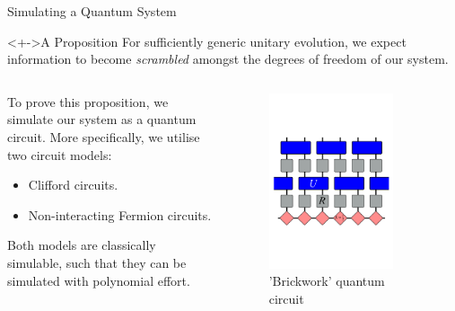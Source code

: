   \begin{frame}{Simulating a Quantum System}
    \begin{block}<+->{A Proposition}
      For sufficiently generic unitary evolution, we expect information to become \textit{scrambled} amongst the degrees of freedom of our system. 
      \end{block}
\begin{columns}

\begin{column}{0.5\textwidth}
  \vspace{-0.8cm}

      To prove this proposition, we simulate our system as a quantum circuit. More specifically, we utilise two circuit models:
      \begin{itemize}
        \item Clifford circuits.
        \item Non-interacting Fermion circuits.
      \end{itemize}
      Both models are classically simulable, such that they can be simulated with polynomial effort. 
  
\end{column}

\begin{column}{0.475\textwidth}
  \vspace{-2cm}
  \begin{figure}
    \includegraphics[width = 0.8\textwidth]{QS_Images/quantum circuit.pdf}
    \vspace{-2cm}
    \caption{'Brickwork' quantum circuit \cite{Nahum_2017}}
  \end{figure}
\end{column}
  
\end{columns}

\end{frame}
